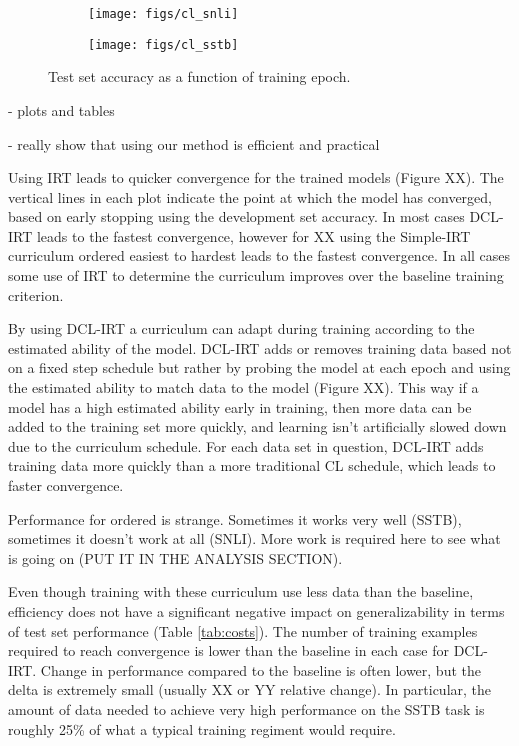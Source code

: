 \documentclass[letterpaper]{article} %
\begin{document}
\captionsetup[subfigure]{labelformat=empty}
\begin{figure*}[th!]
	\centering
	\begin{subfigure}[b]{0.45\textwidth}
		\centering
		\texttt{[image: figs/cl\_snli]}
		\caption{\label{fig:cl_snli}} 
		\vspace{-2em} 
	\end{subfigure} 
	\begin{subfigure}[b]{0.45\textwidth}
		\centering
		\texttt{[image: figs/cl\_sstb]}
		\caption{\label{fig:cl_sstb}} 
		\vspace{-2em} 
	\end{subfigure} 
	
	\caption{Test set accuracy as a function of training epoch.}
	\label{fig:acc_nlp}
\end{figure*}

- plots and tables 

- really show that using our method is efficient and practical 

Using IRT leads to quicker convergence for the trained models (Figure XX).
The vertical lines in each plot indicate the point at which the model has converged, based on early stopping using the development set accuracy.
In most cases DCL-IRT leads to the fastest convergence, however for XX using the Simple-IRT curriculum ordered easiest to hardest leads to the fastest convergence.
In all cases some use of IRT to determine the curriculum improves over the baseline training criterion. 

By using DCL-IRT a curriculum can adapt during training according to the estimated ability of the model.
DCL-IRT adds or removes training data based not on a fixed step schedule but rather by probing the model at each epoch and using the estimated ability to match data to the model (Figure XX).
This way if a model has a high estimated ability early in training, then more data can be added to the training set more quickly, and learning isn't artificially slowed down due to the curriculum schedule.
For each data set in question, DCL-IRT adds training data more quickly than a more traditional CL schedule, which leads to faster convergence.

Performance for ordered is strange.
Sometimes it works very well (SSTB), sometimes it doesn't work at all (SNLI).
More work is required here to see what is going on (PUT IT IN THE ANALYSIS SECTION).

Even though training with these curriculum use less data than the baseline, efficiency does not have a significant negative impact on generalizability in terms of test set performance (Table \ref{tab:costs}).
The number of training examples required to reach convergence is lower than the baseline in each case for DCL-IRT.
Change in performance compared to the baseline is often lower, but the delta is extremely small (usually XX or YY relative change). 
In particular, the amount of data needed to achieve very high performance on the SSTB task is roughly 25\% of what a typical training regiment would require.
\end{document}
